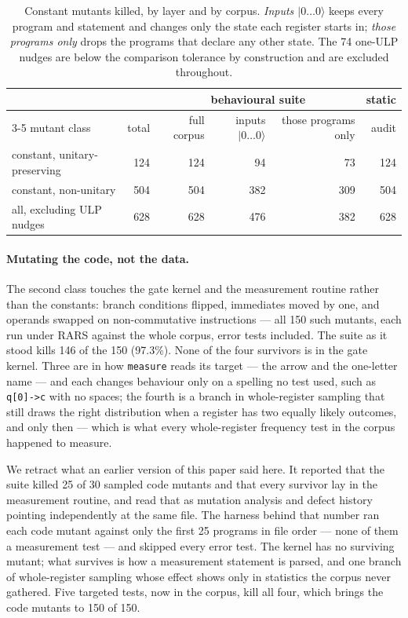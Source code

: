 \documentclass[11pt]{article}
\newcommand{\ket}[1]{\ensuremath{|#1\rangle}}
\begin{document}
\begin{table}[t]
\centering
\begin{tabular}{lrrrrr}
\toprule
 & & \multicolumn{3}{c}{behavioural suite} & static \\
\cmidrule(lr){3-5}
mutant class & total & full corpus & inputs \ket{0\ldots0} & those programs only & audit \\
\midrule
constant, unitary-preserving & 124 & 124 & 94 & 73 & 124 \\
constant, non-unitary        & 504 & 504 & 382 & 309 & 504 \\
\midrule
all, excluding ULP nudges    & 628 & 628 & 476 & 382 & 628 \\
\bottomrule
\end{tabular}
\caption{Constant mutants killed, by layer and by corpus. \emph{Inputs \ket{0\ldots0}}
keeps every program and statement and changes only the state each register starts in;
\emph{those programs only} drops the programs that declare any other state. The
74 one-ULP nudges are below the comparison tolerance by construction and are excluded
throughout.}
\label{tab:mutation}
\end{table}

\paragraph{Mutating the code, not the data.} The second class touches the gate kernel and
the measurement routine rather than the constants: branch conditions flipped, immediates
moved by one, and operands swapped on non-commutative instructions --- all 150 such
mutants, each run under RARS against the whole corpus, error tests included. The suite as it stood kills 146 of the 150 (97.3\%). None of the four survivors is in the gate kernel. Three are in how \texttt{measure} reads its target --- the arrow and the one-letter name --- and each changes behaviour only on a spelling no test used, such as \texttt{q[0]->c} with no spaces; the fourth is a branch in whole-register sampling that still draws the right distribution when a register has two equally likely outcomes, and only then --- which is what every whole-register frequency test in the corpus happened to measure.

We retract what an earlier version of this paper said here. It reported that the suite
killed 25 of 30 sampled code mutants and that every survivor lay in the measurement
routine, and read that as mutation analysis and defect history pointing independently at
the same file. The harness behind that number ran each code mutant against only the first
25 programs in file order --- none of them a measurement test --- and skipped every error
test. The kernel has no surviving mutant; what survives is how a measurement statement is
parsed, and one branch of whole-register sampling whose effect shows only in statistics
the corpus never gathered. Five targeted tests, now
in the corpus, kill all four, which brings the code mutants to 150 of 150.
\end{document}
